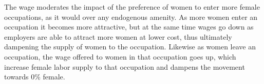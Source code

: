 \documentclass[12pt]{article}
\begin{document}
The wage moderates the impact of the preference of women to enter more female occupations, as it would over any endogenous amenity. As more women enter an occupation it becomes more attractive, but at the same time wages go down as employers are able to attract more women at lower cost, thus ultimately dampening the supply of women to the occupation. Likewise as women leave an occupation, the wage offered to women in that occupation goes up, which increase female labor supply to that occupation and dampens the movement towards 0\% female.







\end{document}
